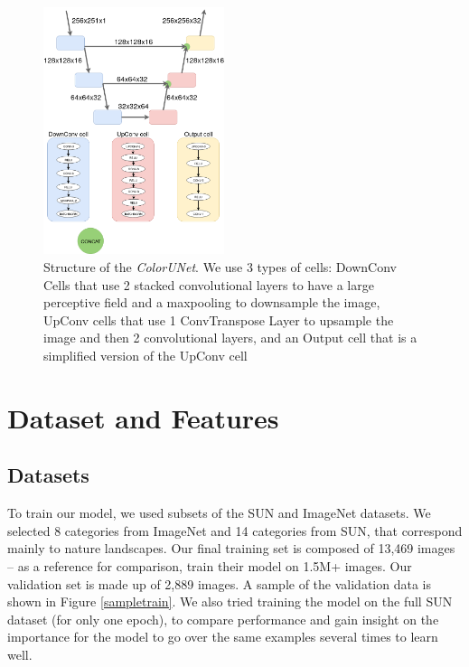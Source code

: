 \documentclass[10pt,twocolumn,letterpaper]{article}
\begin{document}
\begin{figure}
\begin{center}
\includegraphics[width=200px]{diagram}
\caption{Structure of the \textit{ColorUNet}. We use 3 types of cells: DownConv Cells that use 2 stacked convolutional layers to have a large perceptive field and a maxpooling to downsample the image, UpConv cells that use 1 ConvTranspose Layer to upsample the image and then 2 convolutional layers, and an Output cell that is a simplified version of the UpConv cell}
\label{structure}
\end{center}
\end{figure}

\section{Dataset and Features}

\subsection{Datasets}
To train our model, we used subsets of the SUN \cite{xiao2010sun} and ImageNet \cite{russakovsky2015imagenet} datasets. We selected 8 categories from ImageNet and 14 categories from SUN, that correspond mainly to nature landscapes. Our final training set is composed of 13,469 images -- as a reference for comparison, \cite{zhang2016colorful} train their model on 1.5M+ images. Our validation set is made up of 2,889 images. A sample of the validation data is shown in Figure \ref{sampletrain}.
We also tried training the model on the full SUN dataset (for only one epoch), to compare performance and gain insight on the importance for the model to go over the same examples several times to learn well.
\end{document}
